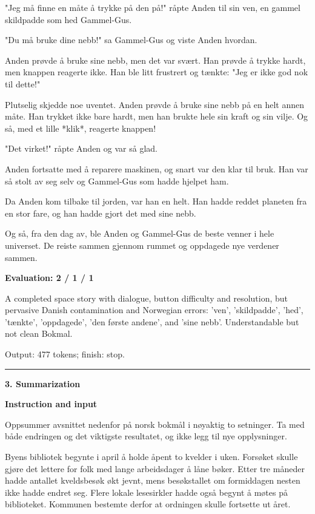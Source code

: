 \documentclass[10pt]{article}
\begin{document}
{\begin{minipage}{\textwidth}
\par\smallskip
"Jeg må finne en måte å trykke på den på!" råpte Anden til sin ven, en gammel skildpadde som hed Gammel-Gus.
\par\smallskip
"Du må bruke dine nebb!" sa Gammel-Gus og viste Anden hvordan.
\par\smallskip
Anden prøvde å bruke sine nebb, men det var svært. Han prøvde å trykke hardt, men knappen reagerte ikke. Han ble litt frustrert og tænkte: "Jeg er ikke god nok til dette!"
\par\smallskip
Plutselig skjedde noe uventet. Anden prøvde å bruke sine nebb på en helt annen måte. Han trykket ikke bare hardt, men han brukte hele sin kraft og sin vilje. Og så, med et lille *klik*, reagerte knappen!
\par\smallskip
"Det virket!" råpte Anden og var så glad.
\par\smallskip
Anden fortsatte med å reparere maskinen, og snart var den klar til bruk. Han var så stolt av seg selv og Gammel-Gus som hadde hjelpet ham.
\par\smallskip
Da Anden kom tilbake til jorden, var han en helt. Han hadde reddet planeten fra en stor fare, og han hadde gjort det med sine nebb.
\par\smallskip
Og så, fra den dag av, ble Anden og Gammel-Gus de beste venner i hele universet. De reiste sammen gjennom rummet og oppdagede nye verdener sammen.\par\smallskip
\textbf{Evaluation: 2 / 1 / 1}\par A completed space story with dialogue, button difficulty and resolution, but pervasive Danish contamination and Norwegian errors: 'ven', 'skildpadde', 'hed', 'tænkte', 'oppdagede', 'den første andene', and 'sine nebb'. Understandable but not clean Bokmal.
\par {\color{gray} Output: 477 tokens; finish: stop.}\par
\medskip\hrule\smallskip
{\bfseries 3. Summarization}\par\smallskip
\textbf{Instruction and input}\par Oppsummer avsnittet nedenfor på norsk bokmål i nøyaktig to setninger. Ta med både endringen og det viktigste resultatet, og ikke legg til nye opplysninger.
\par\smallskip
Byens bibliotek begynte i april å holde åpent to kvelder i uken. Forsøket skulle gjøre det lettere for folk med lange arbeidsdager å låne bøker. Etter tre måneder hadde antallet kveldsbesøk økt jevnt, mens besøkstallet om formiddagen nesten ikke hadde endret seg. Flere lokale lesesirkler hadde også begynt å møtes på biblioteket. Kommunen bestemte derfor at ordningen skulle fortsette ut året.\par\smallskip

\end{minipage}}
\end{document}

